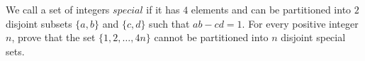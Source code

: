 We call a set of integers $\textit{special}$ if it has $4$ elements and can be partitioned into $2$ disjoint subsets $\{ a,b \}$ and $\{ c, d \}$ such that $ab - cd = 1$. For every positive integer $n$,  prove that the set $\{ 1, 2, \dots, 4n \}$ cannot be partitioned into $n$ disjoint special sets.
